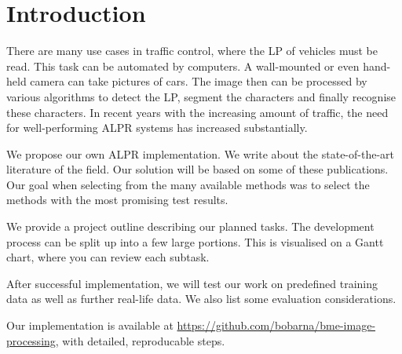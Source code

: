 \section{Introduction}

There are many use cases in traffic control, where the \ac{LP} of vehicles must
be read.  This task can be automated by computers. A wall-mounted or even
hand-held camera can take pictures of cars. The image then can be processed by
various algorithms to detect the \ac{LP}, segment the characters and finally
recognise these characters.  In recent years with the increasing amount of
traffic, the need for well-performing \ac{ALPR} systems has increased
substantially.

We propose our own \ac{ALPR} implementation.  We write about the
state-of-the-art literature of the field. Our solution will be based on some of
these publications. Our goal when selecting from the many available methods was
to select the methods with the most promising test results.

We provide a project outline describing our planned tasks. The development
process can be split up into a few large portions. This is visualised on a Gantt
chart, where you can review each subtask.

After successful implementation, we will test our work on predefined training
data as well as further real-life data. We also list some evaluation
considerations.

Our implementation is available at
\url{https://github.com/bobarna/bme-image-processing}, with detailed,
reproducable steps.
